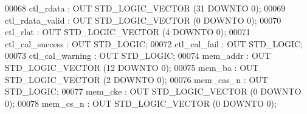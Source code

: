 \begin{DoxyCode}
{00068         \textcolor{vhdlchar}{ctl_rdata}   \textcolor{vhdlchar}{:} \textcolor{keywordflow}{OUT} \textcolor{comment}{STD\_LOGIC\_VECTOR} \textcolor{vhdlchar}{(}\textcolor{vhdllogic}{}\textcolor{vhdllogic}{31} \textcolor{keywordflow}{DOWNTO} \textcolor{vhdllogic}{}\textcolor{vhdllogic}{0}\textcolor{vhdlchar}{)};
00069         \textcolor{vhdlchar}{ctl_rdata_valid} \textcolor{vhdlchar}{:} \textcolor{keywordflow}{OUT} \textcolor{comment}{STD\_LOGIC\_VECTOR} \textcolor{vhdlchar}{(}\textcolor{vhdllogic}{}\textcolor{vhdllogic}{0} \textcolor{keywordflow}{DOWNTO} \textcolor{vhdllogic}{}\textcolor{vhdllogic}{0}\textcolor{vhdlchar}{)};
00070         \textcolor{vhdlchar}{ctl_rlat}    \textcolor{vhdlchar}{:} \textcolor{keywordflow}{OUT} \textcolor{comment}{STD\_LOGIC\_VECTOR} \textcolor{vhdlchar}{(}\textcolor{vhdllogic}{}\textcolor{vhdllogic}{4} \textcolor{keywordflow}{DOWNTO} \textcolor{vhdllogic}{}\textcolor{vhdllogic}{0}\textcolor{vhdlchar}{)};
00071         \textcolor{vhdlchar}{ctl_cal_success} \textcolor{vhdlchar}{:} \textcolor{keywordflow}{OUT} \textcolor{comment}{STD\_LOGIC};
00072         \textcolor{vhdlchar}{ctl_cal_fail}    \textcolor{vhdlchar}{:} \textcolor{keywordflow}{OUT} \textcolor{comment}{STD\_LOGIC};
00073         \textcolor{vhdlchar}{ctl_cal_warning} \textcolor{vhdlchar}{:} \textcolor{keywordflow}{OUT} \textcolor{comment}{STD\_LOGIC};
00074         \textcolor{vhdlchar}{mem_addr}    \textcolor{vhdlchar}{:} \textcolor{keywordflow}{OUT} \textcolor{comment}{STD\_LOGIC\_VECTOR} \textcolor{vhdlchar}{(}\textcolor{vhdllogic}{}\textcolor{vhdllogic}{12} \textcolor{keywordflow}{DOWNTO} \textcolor{vhdllogic}{}\textcolor{vhdllogic}{0}\textcolor{vhdlchar}{)};
00075         \textcolor{vhdlchar}{mem_ba}  \textcolor{vhdlchar}{:} \textcolor{keywordflow}{OUT} \textcolor{comment}{STD\_LOGIC\_VECTOR} \textcolor{vhdlchar}{(}\textcolor{vhdllogic}{}\textcolor{vhdllogic}{2} \textcolor{keywordflow}{DOWNTO} \textcolor{vhdllogic}{}\textcolor{vhdllogic}{0}\textcolor{vhdlchar}{)};
00076         \textcolor{vhdlchar}{mem_cas_n}   \textcolor{vhdlchar}{:} \textcolor{keywordflow}{OUT} \textcolor{comment}{STD\_LOGIC};
00077         \textcolor{vhdlchar}{mem_cke} \textcolor{vhdlchar}{:} \textcolor{keywordflow}{OUT} \textcolor{comment}{STD\_LOGIC\_VECTOR} \textcolor{vhdlchar}{(}\textcolor{vhdllogic}{}\textcolor{vhdllogic}{0} \textcolor{keywordflow}{DOWNTO} \textcolor{vhdllogic}{}\textcolor{vhdllogic}{0}\textcolor{vhdlchar}{)};
00078         \textcolor{vhdlchar}{mem_cs_n}    \textcolor{vhdlchar}{:} \textcolor{keywordflow}{OUT} \textcolor{comment}{STD\_LOGIC\_VECTOR} \textcolor{vhdlchar}{(}\textcolor{vhdllogic}{}\textcolor{vhdllogic}{0} \textcolor{keywordflow}{DOWNTO} \textcolor{vhdllogic}{}\textcolor{vhdllogic}{0}\textcolor{vhdlchar}{)};
}
\end{DoxyCode}

